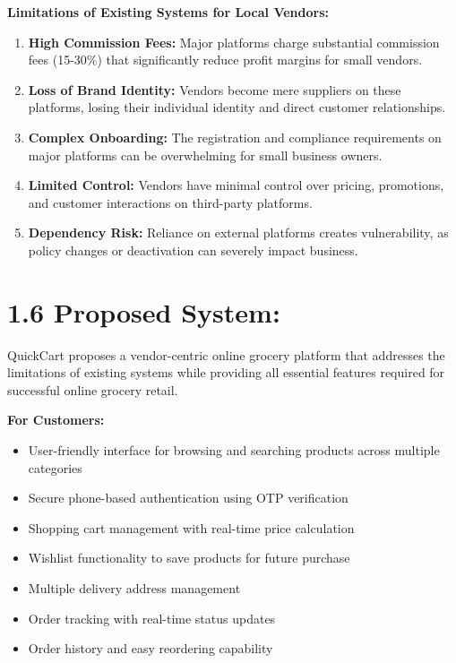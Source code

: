 \documentclass[12pt,a4paper]{report}
\begin{document}
\textbf{Limitations of Existing Systems for Local Vendors:}

\begin{enumerate}
    \item \textbf{High Commission Fees:} Major platforms charge substantial commission fees (15-30\%) that significantly reduce profit margins for small vendors.
    
    \item \textbf{Loss of Brand Identity:} Vendors become mere suppliers on these platforms, losing their individual identity and direct customer relationships.
    
    \item \textbf{Complex Onboarding:} The registration and compliance requirements on major platforms can be overwhelming for small business owners.
    
    \item \textbf{Limited Control:} Vendors have minimal control over pricing, promotions, and customer interactions on third-party platforms.
    
    \item \textbf{Dependency Risk:} Reliance on external platforms creates vulnerability, as policy changes or deactivation can severely impact business.
\end{enumerate}

\section*{1.6 Proposed System:}

QuickCart proposes a vendor-centric online grocery platform that addresses the limitations of existing systems while providing all essential features required for successful online grocery retail.

\textbf{For Customers:}
\begin{itemize}
    \item User-friendly interface for browsing and searching products across multiple categories
    \item Secure phone-based authentication using OTP verification
    \item Shopping cart management with real-time price calculation
    \item Wishlist functionality to save products for future purchase
    \item Multiple delivery address management
    \item Order tracking with real-time status updates
    \item Order history and easy reordering capability
\end{itemize}
\end{document}
